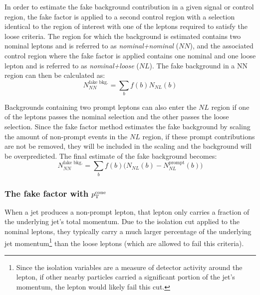 In order to estimate the fake background contribution in a given signal or control region, the fake factor is applied to a second control region with a selection identical to the region of interest with one of the leptons required to satisfy the loose criteria.
The region for which the background is estimated contains two nominal leptons and is referred to as \emph{nominal+nominal} ($NN$), and the associated control region where the fake factor is applied contains one nominal and one loose lepton and is referred to as \emph{nominal+loose} ($NL$).
The fake background in a NN region can then be calculated as:
\begin{equation}
N_{NN}^{\textrm{fake\ bkg.}} = \sum\limits_{b}f(b) N_{NL}(b)
\label{eq:ssww13tev_ff_bkg_nosub}
\end{equation}

Backgrounds containing two prompt leptons can also enter the $NL$ region if one of the leptons passes the nominal selection and the other passes the loose selection.
Since the fake factor method estimates the fake background by scaling the amount of non-prompt events in the $NL$ region, if these prompt contributions are not be removed, they will be included in the scaling and the background will be overpredicted.
The final estimate of the fake background becomes:
\begin{equation}
N_{NN}^{\textrm{fake\ bkg.}} = \sum\limits_{b}f(b) \big(N_{NL}(b) - N_{NL}^{\textrm{prompt}}(b)\big)
\label{eq:ssww13tev_ff_bkg}
\end{equation}

%
\subsubsection{The fake factor with $p_{\mathrm{T}}^{\textrm{cone}}$}\label{ssww13tev:ff_method_ptcone}
When a jet produces a non-prompt lepton, that lepton only carries a fraction of the underlying jet's total momentum.
Due to the isolation cut applied to the nominal leptons, they typically carry a much larger percentage of the underlying jet momentum\footnote{Since the isolation variables are a measure of detector activity around the lepton, if other nearby particles carried a significant portion of the jet's momentum, the lepton would likely fail this cut.} than the loose leptons (which are allowed to fail this criteria).

